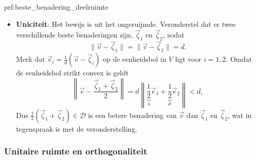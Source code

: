 \begin{prf}{prf:beste_benadering_deelruimte}
\begin{itemize}
\begin{equation*}
                \|\vec{v} - \vec{\zeta}\| \leq \underbrace{\|\vec{v} - \vec{w}_k\|}_{\rightarrow d} + \underbrace{\|\vec{w}_k - \vec{\zeta}\|}_{\rightarrow 0},
            \end{equation*}
            wat $\|\vec{v} - \vec{\zeta}\| = d$ impliceert. De vector $\vec{\zeta}$ is bijgevolg de beste benadering van $\vec{v}$ in $\mathcal{D}$.
\newpage
        \item 
            \textbf{Uniciteit}: Het bewijs is uit het ongeruijmde. Veronderstel dat er twee verschillende beste benaderingen zijn, $\vec{\zeta}_1$ en $\vec{\zeta}_2$, zodat 
            \begin{equation*}
                \|\vec{v} - \vec{\zeta}_1\| = \|\vec{v} - \vec{\zeta}_2\| = d.
            \end{equation*}
            Merk dat $\vec{e}_i = \frac{1}{d}(\vec{v} - \vec{\zeta}_i)$ op de eenheidsbol in $V$ ligt voor $i = 1,2$. Omdat de eenheidsbol strikt convex is geldt
            \begin{equation*}
                \left\| \vec{v} - \frac{\vec{\zeta}_1 + \vec{\zeta}_2}{2} \right\| = d \left\| \underbrace{\frac{1}{2}}_\lambda\vec{e}_1 + \underbrace{\frac{1}{2}}_\mu\vec{e}_2 \right\| < d,
            \end{equation*}
            Dus $\frac{1}{2}(\vec{\zeta}_1 + \vec{\zeta}_2) \in \mathcal{D}$ is een betere benadering van $\vec{v}$ dan $\vec{\zeta}_1$ en $\vec{\zeta}_2$, wat in tegenspraak is met de veronderstelling.
    \end{itemize}
\end{prf}

\subsubsection{Unitaire ruimte en orthogonaliteit}

\vspace{0.5cm}

